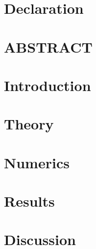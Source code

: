 \documentclass{article}
\begin{document}

\newpage
\section*{Declaration}

\newpage
\section*{ABSTRACT}

\newpage
\tableofcontents
{}

\newpage
\section{Introduction}

\newpage
\section{Theory}

\newpage
\section{Numerics}

\newpage
\section{Results}

\newpage
\section{Discussion}


\newpage
\printbibliography
\end{document}
